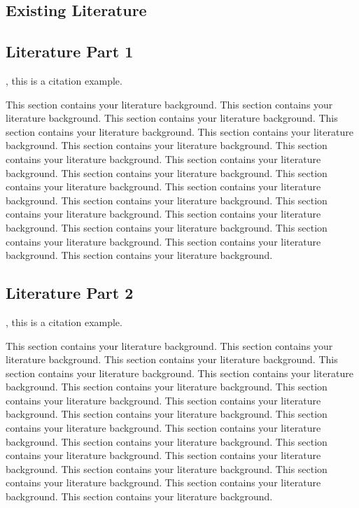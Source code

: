 {
\begin{doublespacing}
\begin{flushleft}
\section{Existing Literature}
\subsection{Literature Part 1}

\cite{ahu61}, this is a citation example.

This section contains your literature background. This section contains your literature background. This section contains your literature background. This section contains your literature background. This section contains your literature background. This section contains your literature background. This section contains your literature background. This section contains your literature background. This section contains your literature background. This section contains your literature background. This section contains your literature background. This section contains your literature background. This section contains your literature background. This section contains your literature background. This section contains your literature background. This section contains your literature background. This section contains your literature background. This section contains your literature background.

\subsection{Literature Part 2}

\cite{ahu61}, this is a citation example.

This section contains your literature background. This section contains your literature background. This section contains your literature background. This section contains your literature background. This section contains your literature background. This section contains your literature background. This section contains your literature background. This section contains your literature background. This section contains your literature background. This section contains your literature background. This section contains your literature background. This section contains your literature background. This section contains your literature background. This section contains your literature background. This section contains your literature background. This section contains your literature background. This section contains your literature background. This section contains your literature background.


\end{flushleft}
\end{doublespacing}}
